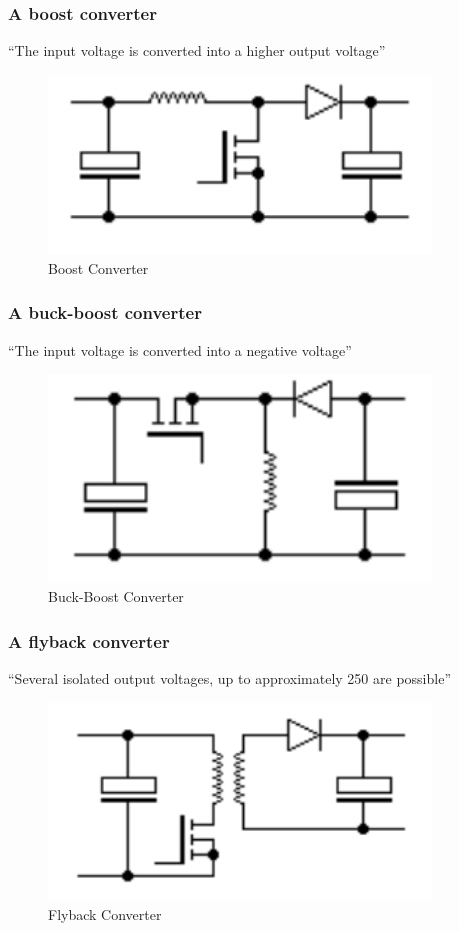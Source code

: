 \subsubsection{A boost converter} 
``The input voltage is converted into a higher output voltage''\cite{SMPSD}
\begin{figure}[H]
\begin{center}
\includegraphics[width=4in]{includes/Boost}
\caption{Boost Converter}
\end{center}
\end{figure}

\subsubsection{A buck-boost converter}
 ``The input voltage is converted into a negative voltage''\cite{SMPSD}
\begin{figure}[H]
\begin{center}
\includegraphics[width=4in]{includes/BuckBoost}
\caption{Buck-Boost Converter}
\end{center}
\end{figure}

\subsubsection{A flyback converter} 
``Several isolated output voltages, up to approximately 250 are possible''\cite{SMPSD}
\begin{figure}[H]
\begin{center}
\includegraphics[width=4in]{includes/Flyback}
\caption{Flyback Converter}
\end{center}
\end{figure}

